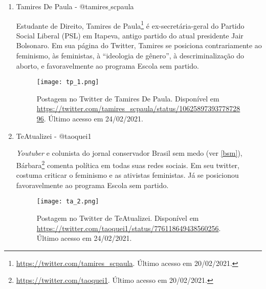 \documentclass[
	12pt,				%
	openright,			%
	twoside,			%
	a4paper,			%
	english,			%
	brazil				%
	]{abntex2}
\begin{document}
\begin{anexosenv}
\begin{enumerate}
 \begin{figure}[!htbp]
    \centering
    \texttt{[image: sm\_1.png]}
    \caption{Postagem no Twitter de Silas Malafaia. Disponível em \url{https://twitter.com/PastorMalafaia/status/1042513046629965825}. Último acesso em 24/02/2021.}
 \end{figure}
  
 \item Tamires De Paula - @tamires$\_$scpaula
 
 Estudante de Direito, Tamires de Paula\footnote{\url{https://twitter.com/tamires_scpaula}. Último acesso em 20/02/2021.} é ex-secretária-geral do Partido Social Liberal (PSL) em Itapeva, antigo partido do atual presidente Jair Bolsonaro. Em sua página do Twitter, Tamires se posiciona contrariamente ao feminismo, às feministas, à ``ideologia de gênero'', à descriminalização do aborto, e favoravelmente ao programa Escola sem partido.
 
 \begin{figure}[!htbp]
    \centering
    \texttt{[image: tp\_1.png]}
    \caption{Postagem no Twitter de Tamires De Paula. Disponível em \url{https://twitter.com/tamires_scpaula/status/1062589739377872896}. Último acesso em 24/02/2021.}
 \end{figure}
  
 \item TeAtualizei - @taoquei1
 
 \textit{Youtuber} e colunista do jornal conservador Brasil sem medo (ver \ref{bsm}), Bárbara\footnote{\url{https://twitter.com/taoquei1}. Último acesso em 20/02/2021.} comenta política em todas suas redes sociais. Em seu twitter, costuma criticar o feminismo e as ativistas feministas. Já se posicionou favoravelmente ao programa Escola sem partido.
 
 
 \begin{figure}[!htbp]
    \centering
    \texttt{[image: ta\_2.png]}
    \caption{Postagem no Twitter de TeAtualizei. Disponível em \url{https://twitter.com/taoquei1/status/776118649438560256}. Último acesso em 24/02/2021.}
 \end{figure}
 

\end{enumerate}
\end{anexosenv}
\end{document}
